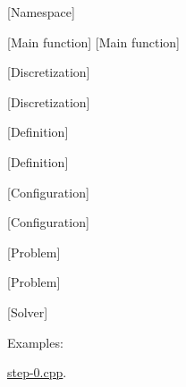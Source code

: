 \mbox{[}Namespace\mbox{]} 

\mbox{[}Main function\mbox{]} \mbox{[}Main function\mbox{]}

\mbox{[}Discretization\mbox{]}

\mbox{[}Discretization\mbox{]}

\mbox{[}Definition\mbox{]}

\mbox{[}Definition\mbox{]}

\mbox{[}Configuration\mbox{]}

\mbox{[}Configuration\mbox{]}

\mbox{[}Problem\mbox{]}

\mbox{[}Problem\mbox{]}

\mbox{[}Solver\mbox{]} \begin{Desc}
\item[Examples\-: ]\par
\hyperlink{step-0_8cpp-example}{step-\/0.\-cpp}.\end{Desc}

